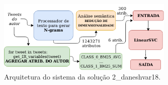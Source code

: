 \begin{figure}[h]
    \centering
    \caption{Arquitetura do sistema da solução 2\_daneshvar18.}
    \begin{center}
        \includegraphics[width=0.75\textwidth]{img/2-daneshvar18-arquitetura-com-ri.png}
    \end{center}
    \vspace{-0.5cm}
    \label{fig:2-daneshvar18-arquitetura-com-ri}
\end{figure}